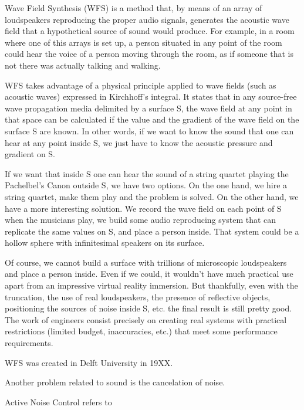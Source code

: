 Wave Field Synthesis (WFS) is a method that, by means of an array of loudspeakers reproducing the proper audio signals, generates the acoustic wave field that a hypothetical source of sound would produce. For example, in a room where one of this arrays is set up, a person situated in any point of the room could hear the voice of a person moving through the room, as if someone that is not there was actually talking and walking.

WFS takes advantage of a physical principle applied to wave fields (such as acoustic waves) expressed in Kirchhoff's integral. It states that in any source-free wave propagation media delimited by a surface S, the wave field at any point in that space can be calculated if the value and the gradient of the wave field on the surface S are known. In other words, if we want to know the sound that one can hear at any point inside S, we just have to know the acoustic pressure and gradient on S.

If we want that inside S one can hear the sound of a string quartet playing the Pachelbel's Canon outside S, we have two options. On the one hand, we hire a string quartet, make them play and the problem is solved. On the other hand, we have a more interesting solution. We record the wave field on each point of S when the musicians play, we build some audio reproducing system that can replicate the same values on S, and place a person inside. That system could be a hollow sphere with infinitesimal speakers on its surface.

Of course, we cannot build a surface with trillions of microscopic loudspeakers and place a person inside. Even if we could, it wouldn't have much practical use apart from an impressive virtual reality immersion. But thankfully, even with the truncation, the use of real loudspeakers, the presence of reflective objects, positioning the sources of noise inside S, etc. the final result is still pretty good. The work of engineers consist precisely on creating real systems with practical restrictions (limited budget, inaccuracies, etc.) that meet some performance requirements.

WFS was created in Delft University in 19XX.

Another problem related to sound is the cancelation of noise. 

Active Noise Control refers to 